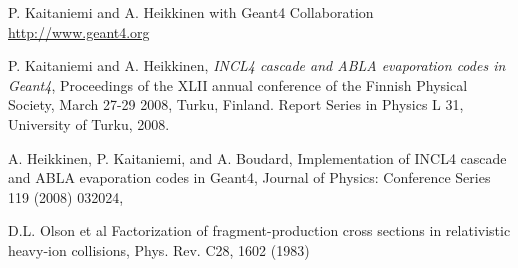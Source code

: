 \documentclass[12pt]{article}
\begin{document}
\begin{thebibliography}{9}

P. Kaitaniemi and A. Heikkinen with Geant4 Collaboration
\href{http://www.geant4.org}{http://www.geant4.org}

P. Kaitaniemi and A. Heikkinen,  
{\em INCL4 cascade and ABLA evaporation codes in Geant4},
Proceedings of the XLII annual conference of the Finnish Physical Society, 
                 March 27-29 2008, Turku, Finland. 
                 Report Series in Physics L 31, University of Turku, 2008.

A. Heikkinen, P. Kaitaniemi, and A. Boudard,
Implementation of INCL4 cascade and ABLA evaporation codes in Geant4,
Journal of Physics: Conference Series 119 (2008) 032024, 
{\sf [doi:10.1088/1742-6596/119/3/032024]}

D.L. Olson et al
Factorization of fragment-production cross sections in relativistic heavy-ion collisions,
Phys. Rev. C28, 1602 (1983)
{}

\end{thebibliography}
\end{document}
